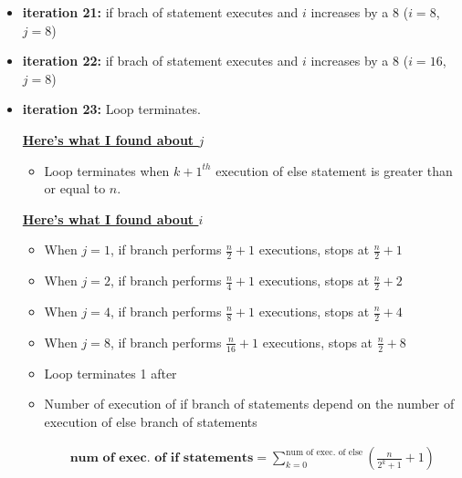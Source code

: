 \documentclass[12pt]{article}
\begin{document}
\begin{enumerate}[a.]
\begin{itemize}
\begin{itemize}
            \item \textbf{iteration 21:} if brach of statement executes and $i$ increases
            by a 8 ($i = 8$, $j = 8$)
            \item \textbf{iteration 22:} if brach of statement executes and $i$ increases
            by a 8 ($i = 16$, $j = 8$)
            \item \textbf{iteration 23:} Loop terminates.

            \bigskip

            \underline{\textbf{Here's what I found about $j$}}

            \bigskip

            \begin{itemize}
                \item Loop terminates when $k+1^{th}$ execution of else statement is greater than or equal to $n$.
            \end{itemize}

            \bigskip

            \underline{\textbf{Here's what I found about $i$}}

            \bigskip

            \begin{itemize}
                \item When $j = 1$, if branch performs $\frac{n}{2} + 1$ executions, stops at $\frac{n}{2} + 1$
                \item When $j = 2$, if branch performs $\frac{n}{4} + 1$ executions, stops at $\frac{n}{2} + 2$
                \item When $j = 4$, if branch performs $\frac{n}{8} + 1$ executions, stops at $\frac{n}{2} + 4$
                \item When $j = 8$, if branch performs $\frac{n}{16} + 1$ executions, stops at $\frac{n}{2} + 8$
                \item Loop terminates 1 after
                \item Number of execution of if branch of statements depend on the number of execution of else branch of statements

                \begin{align}
                    \textbf{num of exec. of if statements} = \sum\limits_{k=0}^{\text{num of exec. of else}} \left(\frac{n}{2^k+1} + 1 \right)
                \end{align}
            \end{itemize}


\end{itemize}
\end{itemize}
\end{enumerate}
\end{document}
